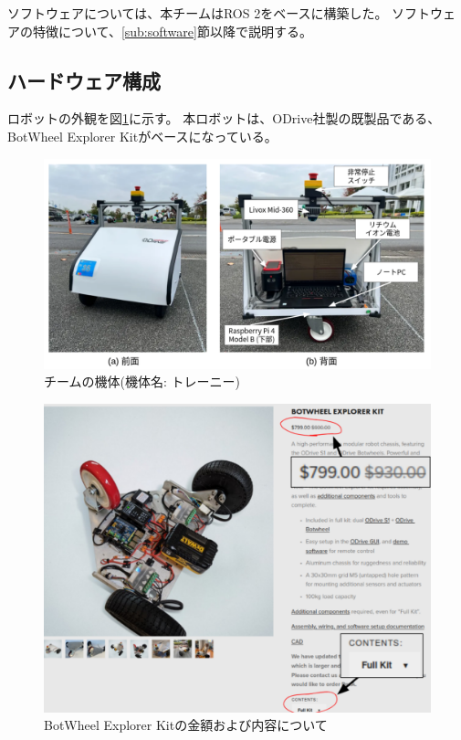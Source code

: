\documentclass[twocolumn,9pt]{jsproceedings}
\begin{document}
ソフトウェアについては、本チームはROS 2\cite{ROS 2}をベースに構築した。
ソフトウェアの特徴について、\ref{sub:software}節以降で説明する。


\subsection{ハードウェア構成}\label{sub:hardware}
ロボットの外観を図\ref{fig:trainee}に示す。
本ロボットは、ODrive社製の既製品である、BotWheel Explorer Kit\cite{RTshop}がベースになっている。

\begin{figure}[h]
  \begin{center}
    \includegraphics[width=1.0\linewidth]{figs/trainee.pdf}
    \caption{チームの機体(機体名: トレーニー)}
    \label{fig:trainee}
  \end{center}
\end{figure}

\begin{figure}[h]
  \begin{center}
    \includegraphics[width=0.8\linewidth]{figs/b_kit_price.pdf}
    \caption{BotWheel Explorer Kitの金額および内容について}
    \label{fig:b_robot_price}
  \end{center}
\end{figure}
\end{document}
